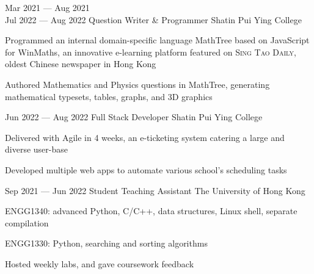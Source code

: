 \cvEntry
{Mar 2021 --- Aug 2021\\Jul 2022 --- Aug 2022 }
{Question Writer \& Programmer}
{Shatin Pui Ying College}
{
\begin{descitemize}
    \specialitem Programmed an internal domain-specific language MathTree based on JavaScript for WinMaths, an innovative e-learning platform featured on {\scshape Sing Tao Daily}, oldest Chinese newspaper in Hong Kong
    \item Authored Mathematics and Physics questions in MathTree, generating mathematical typesets, tables, graphs, and 3D graphics
\end{descitemize}
}

\cvEntry
{Jun 2022 --- Aug 2022}
{Full Stack Developer}
{Shatin Pui Ying College}
{
\begin{descitemize}
    \item Delivered with Agile in 4 weeks, an e-ticketing system catering a large and diverse user-base
    \item Developed multiple web apps to automate various school's scheduling tasks
\end{descitemize}
}

\cvEntry
{Sep 2021 --- Jun 2022}
{Student Teaching Assistant}
{The University of Hong Kong}
{
\begin{descitemize}
    \item ENGG1340: advanced Python, C/C++, data structures, Linux shell, separate compilation
    \item ENGG1330: Python, searching and sorting algorithms
    \item Hosted weekly labs, and gave coursework feedback
\end{descitemize}
}